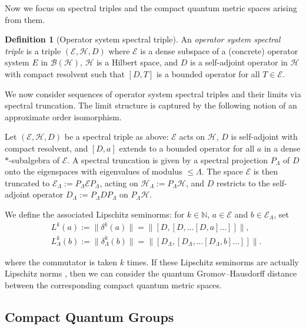 \documentclass[12pt, reqno]{amsart}
\theoremstyle{definition}
\newtheorem{definition}[theorem]{Definition}
\theoremstyle{remark}
\numberwithin{equation}{section}
\begin{document}
Now we focus on spectral triples and the compact quantum metric spaces 
arising from them.

\begin{definition}[Operator system spectral triple]\label{def:op-sys-spectral-triple}
An \emph{operator system spectral triple} is a triple 
$(\mathcal{E}, \mathcal{H}, D)$ where $\mathcal{E}$ is a dense subspace 
of a (concrete) operator system $E$ in $\mathcal{B}(\mathcal{H})$, 
$\mathcal{H}$ is a Hilbert space, and $D$ is a self-adjoint operator 
in $\mathcal{H}$ with compact resolvent such that $[D, T]$ is a bounded 
operator for all $T \in \mathcal{E}$.
\end{definition}

We now consider sequences of operator system spectral triples and their 
limits via spectral truncation.  The limit structure is captured by the following notion of an approximate order isomorphism. 

Let $(\mathcal{E}, \mathcal{H}, D)$ be a spectral triple as above: 
$\mathcal{E}$ acts on $\mathcal{H}$, $D$ is self-adjoint with compact 
resolvent, and $[D, a]$ extends to a bounded operator for all $a$ in a 
dense $*$-subalgebra of $\mathcal{E}$.  
A spectral truncation is given by a spectral projection $P_\Lambda$ of 
$D$ onto the eigenspaces with eigenvalues of modulus $\le \Lambda$.  
The space $\mathcal{E}$ is then truncated to 
$\mathcal{E}_\Lambda := P_\Lambda \mathcal{E} P_\Lambda$, acting on 
$\mathcal{H}_\Lambda := P_\Lambda \mathcal{H}$, and $D$ restricts to the 
self-adjoint operator $D_\Lambda := P_\Lambda D P_\Lambda$ on 
$P_\Lambda \mathcal{H}$.

We define the associated Lipschitz seminorms: for $k \in \mathbb{N}$, 
$a \in \mathcal{E}$ and $b \in \mathcal{E}_\Lambda$, set
\begin{align*}
   & L^k(a)   := \|\delta^k(a)\|   = \bigl\|[D, [D, \dots [D, a] \dots ]]\bigr\|,
\\
&L^k_\Lambda(b) := \|\delta^k_\Lambda(b)\| 
                = \bigl\|[D_\Lambda, [D_\Lambda, \dots [D_\Lambda, b] \dots ]]\bigr\|.
\end{align*}

where the commutator is taken $k$ times.  
If these Lipschitz seminorms are actually Lipschitz norms , then we can consider the quantum 
Gromov--Hausdorff distance between the corresponding compact quantum 
metric spaces.


\subsection{Compact Quantum Groups}
\end{document}
